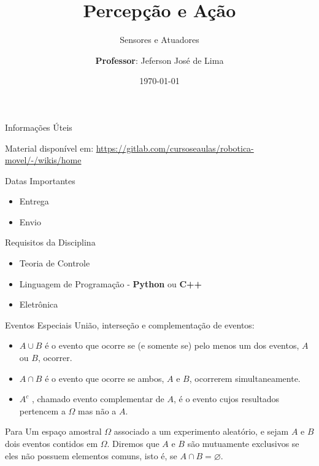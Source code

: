 \documentclass{beamer}
\title{Percepção e Ação}
\subtitle{Sensores e Atuadores}
\date{\today}
\author[Jeferson José de Lima]{
  \textbf{Professor}: Jeferson José de Lima}
\institute[UTFPR-PB]{Departamento de Informática (DAINF)}
\newcommand{\pausar}{\pause}
\begin{document}
\maketitle
 
\begin{frame}{Informações Úteis}
	\begin{block}{Material disponível em:}
		\href{Robótica Móvel - Wiki}{https://gitlab.com/cursoseaulas/robotica-movel/-/wikis/home}
	\end{block} 
	\pausar
	\begin{block}{Datas Importantes}
		\begin{itemize}
		\item Entrega
		\item Envio
		\end{itemize}
	\end{block}
	\pausar
	\begin{block}{Requisitos da Disciplina}
		\begin{itemize}
		\item Teoria de Controle
		\item Linguagem de Programação - \textbf{Python} ou \textbf{C++}
		\item Eletrônica
		\end{itemize}
	\end{block}
\end{frame}



\begin{frame}{Eventos Especiais}
União, interseção e complementação de eventos:

\begin{itemize}
	\item $A  \cup B$ é o evento que ocorre se (e somente se) pelo menos um dos eventos, $A$ ou $B$, ocorrer.
	\item $A \cap B$ é o evento que ocorre se ambos, $A$ e $B$, ocorrerem simultaneamente.
	\item $A^c$ , chamado evento complementar de $A$, é o evento cujos resultados pertencem a $\Omega$ mas não a $A$.
\end{itemize}

\begin{block}{Para}
	Um espaço amostral $\Omega$ associado a um experimento aleatório, e sejam $A$ e $B$ dois eventos
	contidos em $\Omega$. Diremos que $A$ e $B$ são mutuamente exclusivos se eles não possuem elementos comuns,
	isto é, se $A \cap B = \varnothing$.
\end{block}

\end{frame}
\end{document}

